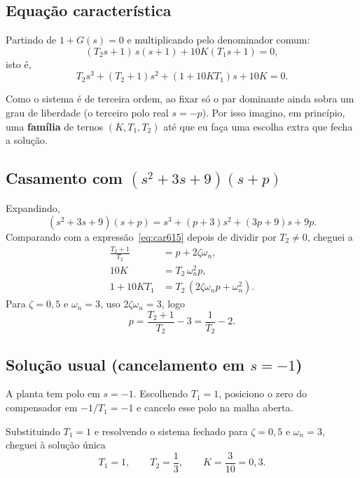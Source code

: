 \documentclass[11pt,a4paper]{article}
\begin{document}
\subsection*{Equação característica}

Partindo de $1+G(s)=0$ e multiplicando pelo denominador comum:
\begin{equation}
  (T_2s+1)\,s(s+1)+10K(T_1s+1)=0 ,
\end{equation}
isto é,
\begin{equation}
  T_2s^3+(T_2+1)s^2+(1+10KT_1)s+10K=0 .
  \label{eq:car615}
\end{equation}

Como o sistema é de terceira ordem, ao fixar só o par dominante ainda sobra um grau de liberdade (o terceiro polo real $s=-p$). Por isso imagino, em princípio, uma \textbf{família} de ternos $(K,T_1,T_2)$ até que eu faça uma escolha extra que fecha a solução.

\subsection*{Casamento com $(s^2+3s+9)(s+p)$}

Expandindo,
\begin{equation}
  (s^2+3s+9)(s+p)=s^3+(p+3)s^2+(3p+9)s+9p .
\end{equation}
Comparando com a expressão~\eqref{eq:car615} depois de dividir por $T_2\neq 0$, cheguei a
\begin{align}
  \frac{T_2+1}{T_2} &= p+2\zeta\omega_n ,\\
  10K &= T_2\,\omega_n^2 p ,\\
  1+10KT_1 &= T_2\,(2\zeta\omega_n p+\omega_n^2).
\end{align}
Para $\zeta=0{,}5$ e $\omega_n=3$, uso $2\zeta\omega_n=3$, logo
\begin{equation}
  p=\frac{T_2+1}{T_2}-3=\frac{1}{T_2}-2 .
\end{equation}

\subsection*{Solução usual (cancelamento em $s=-1$)}

A planta tem polo em $s=-1$. Escolhendo $T_1=1$, posiciono o zero do compensador em $-1/T_1=-1$ e cancelo esse polo na malha aberta.

Substituindo $T_1=1$ e resolvendo o sistema fechado para $\zeta=0{,}5$ e $\omega_n=3$, cheguei à solução única
\begin{equation}
  \boxed{T_1=1,\qquad T_2=\frac{1}{3},\qquad K=\frac{3}{10}=0{,}3.}
\end{equation}
\end{document}
